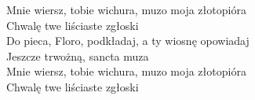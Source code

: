 \begin{flushleft}
\hspace{0.9cm}Mnie wiersz, tobie wichura, muzo moja złotopióra \\
\hspace{0.9cm}Chwalę twe liściaste zgłoski \\
\vskip 3mm
\hspace{0.9cm}Do pieca, Floro, podkładaj, a ty wiosnę opowiadaj \\
\hspace{0.9cm}Jeszcze trwożną, sancta muza \\
\hspace{0.9cm}Mnie wiersz, tobie wichura, muzo moja złotopióra \\
\hspace{0.9cm}Chwalę twe liściaste zgłoski \\
\end{flushleft}
\clearpage
